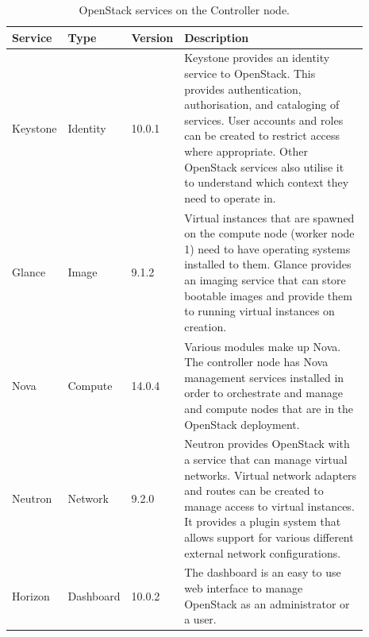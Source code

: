 \begin{longtable}[c]{@{}p{0.12\linewidth}p{0.12\linewidth}p{0.1\linewidth}p{0.55\linewidth}@{}}
\caption[OpenStack Controller Node Service List]{OpenStack services on the Controller node.}
\label{tab:openstack_controller_services}\\
\toprule
Service  & Type          & Version & Description                                                                                                                                                                                                                                                                                             \\* \midrule
\endhead
%
\bottomrule
\endfoot
%
\endlastfoot
%
Keystone & Identity      & 10.0.1  & Keystone provides an identity service to OpenStack. This provides authentication, authorisation, and cataloging of services. User accounts and roles can be created to restrict access where appropriate. Other OpenStack services also utilise it to understand which context they need to operate in. \\
Glance   & Image         & 9.1.2   & Virtual instances that are spawned on the compute node (worker node 1) need to have operating systems installed to them. Glance provides an imaging service that can store bootable images and provide them to running virtual instances on creation.                                                   \\
Nova     & Compute       & 14.0.4  & Various modules make up Nova. The controller node has Nova management services installed in order to orchestrate and manage and compute nodes that are in the OpenStack deployment.                                                                                                                     \\
Neutron  & Network       & 9.2.0   & Neutron provides OpenStack with a service that can manage virtual networks. Virtual network adapters and routes can be created to manage access to virtual instances. It provides a plugin system that allows support for various different external network configurations.                           \\
Horizon  & Dashboard     & 10.0.2  & The dashboard is an easy to use web interface to manage OpenStack as an administrator or a user.                                                                                                                                                                                                        \\

\end{longtable}

